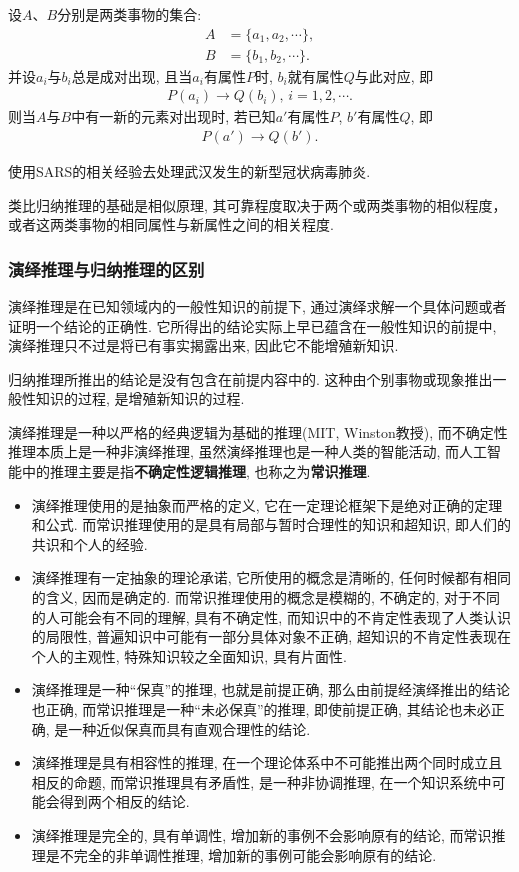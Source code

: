设$A$、$B$分别是两类事物的集合:
\begin{align*}
  A&=\{a_1,a_2,\cdots\},\\
  B&=\{b_1,b_2,\cdots\}.
\end{align*}
并设$a_i$与$b_i$总是成对出现, 且当$a_i$有属性$P$时, $b_i$就有属性$Q$与此对应, 即
\begin{align*}
  P(a_i)\rightarrow Q(b_i),\,i=1,2,\cdots.
\end{align*}
     则当$A$与$B$中有一新的元素对出现时, 若已知$a'$有属性$P$, $b'$有属性$Q$, 即
\begin{align*}
  P(a')\rightarrow Q(b').
\end{align*}
\begin{example}
  使用SARS的相关经验去处理武汉发生的新型冠状病毒肺炎.
\end{example}
\begin{remark}
类比归纳推理的基础是相似原理, 其可靠程度取决于两个或两类事物的相似程度，或者这两类事物的相同属性与新属性之间的相关程度.
\end{remark}
\subsubsection{演绎推理与归纳推理的区别}
演绎推理是在已知领域内的一般性知识的前提下, 通过演绎求解一个具体问题或者证明一个结论的正确性. 它所得出的结论实际上早已蕴含在一般性知识的前提中, 演绎推理只不过是将已有事实揭露出来, 因此它不能增殖新知识.

归纳推理所推出的结论是没有包含在前提内容中的. 这种由个别事物或现象推出一般性知识的过程, 是增殖新知识的过程.

演绎推理是一种以严格的经典逻辑为基础的推理(MIT, Winston教授), 而不确定性推理本质上是一种非演绎推理, 虽然演绎推理也是一种人类的智能活动, 而人工智能中的推理主要是指\textbf{不确定性逻辑推理}, 也称之为\textbf{常识推理}.
\begin{itemize}
\item 演绎推理使用的是抽象而严格的定义, 它在一定理论框架下是绝对正确的定理和公式. 而常识推理使用的是具有局部与暂时合理性的知识和超知识, 即人们的共识和个人的经验.
\item 演绎推理有一定抽象的理论承诺, 它所使用的概念是清晰的, 任何时候都有相同的含义, 因而是确定的. 而常识推理使用的概念是模糊的, 不确定的, 对于不同的人可能会有不同的理解, 具有不确定性, 而知识中的不肯定性表现了人类认识的局限性, 普遍知识中可能有一部分具体对象不正确, 超知识的不肯定性表现在个人的主观性, 特殊知识较之全面知识, 具有片面性.
\item 演绎推理是一种“保真”的推理, 也就是前提正确, 那么由前提经演绎推出的结论也正确, 而常识推理是一种“未必保真”的推理, 即使前提正确, 其结论也未必正确, 是一种近似保真而具有直观合理性的结论.
\item 演绎推理是具有相容性的推理, 在一个理论体系中不可能推出两个同时成立且相反的命题, 而常识推理具有矛盾性, 是一种非协调推理, 在一个知识系统中可能会得到两个相反的结论.
\item 演绎推理是完全的, 具有单调性, 增加新的事例不会影响原有的结论, 而常识推理是不完全的非单调性推理, 增加新的事例可能会影响原有的结论.
\end{itemize}

